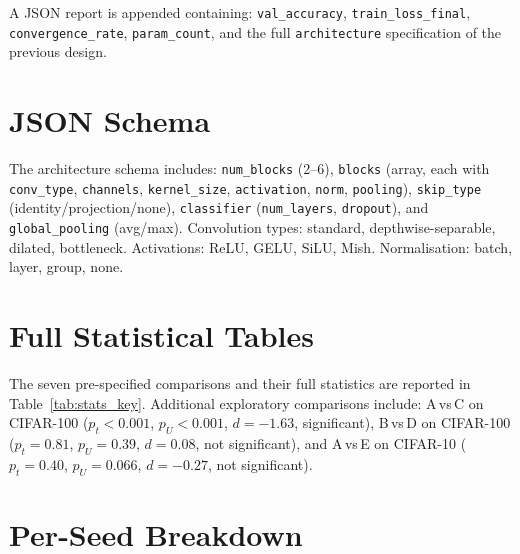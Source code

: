 \documentclass[10pt]{article}
\begin{document}
A JSON report is appended containing: \texttt{val\_accuracy},
\texttt{train\_loss\_final}, \texttt{convergence\_rate},
\texttt{param\_count}, and the full \texttt{architecture} specification of the
previous design.

\section{JSON Schema}
\label{app:schema}

The architecture schema includes: \texttt{num\_blocks} (2--6),
\texttt{blocks} (array, each with \texttt{conv\_type}, \texttt{channels},
\texttt{kernel\_size}, \texttt{activation}, \texttt{norm}, \texttt{pooling}),
\texttt{skip\_type} (identity/projection/none), \texttt{classifier}
(\texttt{num\_layers}, \texttt{dropout}), and \texttt{global\_pooling}
(avg/max).  Convolution types: standard, depthwise-separable, dilated,
bottleneck.  Activations: ReLU, GELU, SiLU, Mish.  Normalisation: batch,
layer, group, none.

\section{Full Statistical Tables}
\label{app:fullstats}

The seven pre-specified comparisons and their full statistics are reported in
Table~\ref{tab:stats_key}.  Additional exploratory comparisons include:
A\,vs\,C on CIFAR-100 ($p_t{<}0.001$, $p_U{<}0.001$, $d{=}{-}1.63$,
significant), B\,vs\,D on CIFAR-100 ($p_t{=}0.81$, $p_U{=}0.39$, $d{=}0.08$,
not significant), and A\,vs\,E on CIFAR-10 ($p_t{=}0.40$, $p_U{=}0.066$,
$d{=}{-}0.27$, not significant).

\section{Per-Seed Breakdown}
\label{app:perseed}
\end{document}
